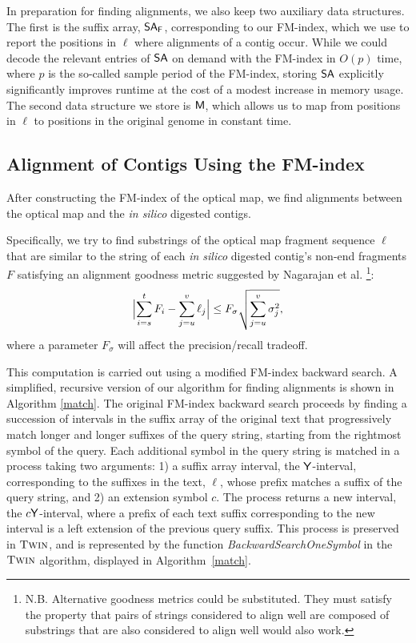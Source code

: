 In preparation for finding alignments, we also keep two auxiliary data structures. The first is the suffix array, $\mbox{\rm {\sf SA}}_{\scriptsize \mbox{\rm {\sf F}}}$, corresponding to our FM-index, which we use to report the positions in $\ell$ where alignments of a contig occur. While we could decode the relevant entries of $\mbox{\rm {\sf SA}}$ on demand with the FM-index in $O(p)$ time, where $p$ is the so-called sample period of the FM-index, storing $\mbox{\rm {\sf SA}}$ explicitly significantly improves runtime at the cost of a modest increase in memory usage. The second data structure we store is $\mbox{\rm {\sf M}}$, which allows us to map from positions in $\ell$ to positions in the original genome in constant time.

\subsection{Alignment of Contigs Using the FM-index}
After constructing the FM-index of the optical map, we find alignments between the optical map and the {\em in silico} digested contigs.  


Specifically, we try to find substrings of the optical map fragment sequence $\ell$ that are similar to the string of each {\em in silico} digested contig's non-end fragments $F$ satisfying an alignment goodness metric suggested by Nagarajan et al. \cite{Nagarajan08} \footnote{N.B. Alternative goodness metrics could be substituted.  They must satisfy the property that pairs of strings considered to align well are composed of substrings that are also considered to align well would also work.}:
\begin{displaymath}
\Bigl \lvert \sum_{i=s}^{t}F_i - \sum_{j=u}^{v}\ell_j \Bigr \rvert \le F_\sigma \sqrt{\sum_{j=u}^{v}\sigma_{j}^{2}},
\end{displaymath}
where a parameter $F_\sigma$  will affect the precision/recall tradeoff.


This computation is carried out using a modified FM-index backward search.  
A simplified, recursive version of our algorithm for finding alignments is shown in Algorithm \ref{match}.
The original FM-index backward search proceeds by finding a succession of intervals in the suffix array of the original text that progressively match longer and longer suffixes of the query string, starting from the rightmost symbol of the query.   Each additional symbol in the query string is matched in a process taking two arguments: 1) a suffix array interval, the $\mathsf{Y}$-interval, corresponding to the suffixes in the text, $\ell$, whose prefix matches a suffix of the query string, and 2) an extension symbol $c$.  The process returns a new interval, the $c\mathsf{Y}$-interval, where a prefix of each text suffix corresponding to the new interval is a left extension of the previous query suffix. This process is preserved in $\mbox{\rm {\sc Twin}}$, and is represented by the function \emph{BackwardSearchOneSymbol} in the $\mbox{\rm {\sc Twin}}$ algorithm, displayed in Algorithm~\ref{match}.

